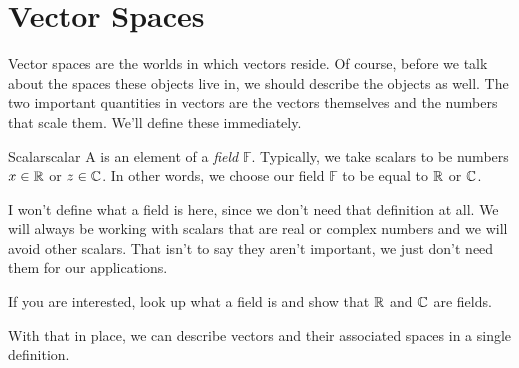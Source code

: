         \section{Vector Spaces}
        
        Vector spaces are the worlds in which vectors reside.  Of course, before we talk about the spaces these objects live in, we should describe the objects as well. The two important quantities in vectors are the vectors themselves and the numbers that scale them.  We'll define these immediately.
        
        \begin{df}{Scalar}{scalar}
        A   is an element of a \emph{field} $\mathbb{F}$.  Typically, we take scalars to be numbers $x\in \mathbb{R}$ or $z\in \mathbb{C}$. In other words, we choose our field $\mathbb{F}$ to be equal to $\mathbb{R}$ or $\mathbb{C}$.
        \end{df}
        
        I won't define what a field is here, since we don't need that definition at all.  We will always be working with scalars that are real or complex numbers and we will avoid other scalars.  That isn't to say they aren't important, we just don't need them for our applications.
        
        \begin{exercise}
            If you are interested, look up what a field is and show that $\mathbb{R}$ and $\mathbb{C}$ are fields.
        \end{exercise}
        
        With that in place, we can describe vectors and their associated spaces in a single definition.  
        

